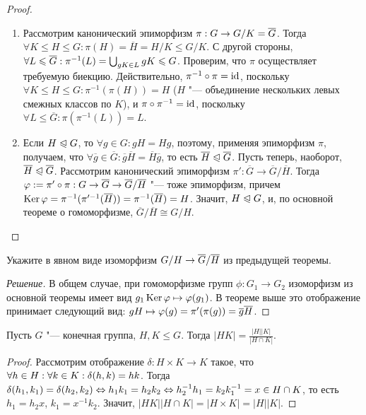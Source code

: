 \begin{proof}~
	\begin{enumerate}
		\item Рассмотрим канонический эпиморфизм $\pi: G \hm\to G / K = \overline{G}$. Тогда $\forall K \le H \le G: \pi(H) =\overline{H} = H / K \le G / K$. С другой стороны, $\forall L \le \overline{G}: \pi^{-1}(L) = \bigcup_{gK \in L}gK \hm\le G$. Проверим, что $\pi$ осуществляет требуемую биекцию. Действительно, $\pi^{-1}\circ\pi \hm= \id$, поскольку $\forall K \le H \le G: \pi^{-1}(\pi(H)) = H$ ($H$ "--- объединение нескольких левых смежных классов по $K$), и $\pi\circ\pi^{-1} = \operatorname{id}$, поскольку $\forall L \le \overline{G}: \pi(\pi^{-1}(L)) = L$.
		
		\item Если $H \trianglelefteqslant G$, то $\forall g \in G: gH = Hg$, поэтому, применяя эпиморфизм $\pi$, получаем, что $\forall \overline{g} \in \overline{G}: \overline{g}\overline{H} = \overline{H}\overline{g}$, то есть $\overline{H} \trianglelefteqslant \overline{G}$. Пусть теперь, наоборот, $\overline{H} \trianglelefteqslant \overline{G}$. Рассмотрим канонический эпиморфизм $\pi': \overline{G} \to \overline{G} / \overline{H}$. Тогда $\phi := \pi'\circ\pi: G \hm\to \overline{G} \hm\to \overline{G} / \overline{H}$ "--- тоже эпиморфизм, причем $\ke\phi = \pi^{-1}(\pi'^{-1}(\overline{H})) \hm= \pi^{-1}(\overline{H}) = H$. Значит, $H \trianglelefteqslant G$, и, по основной теореме о гомоморфизме, $\overline{G} / \overline{H} \cong G / H$.
	\end{enumerate}
\end{proof}

\begin{exercise}
	Укажите в явном виде изоморфизм $G / H \hm\to \overline{G} / \overline{H}$ из предыдущей теоремы.
\end{exercise}

\begin{proof}[Решение]
	В общем случае, при гомоморфизме групп $\phi: G_1 \to G_2$ изоморфизм из основной теоремы имеет вид $g_1\operatorname{Ker}\varphi \mapsto \varphi(g_1)$. В теореме выше это отображение принимает следующий вид: $gH \hm\mapsto \phi(g) = \pi'(\pi(g)) = \overline{g}\overline{H}$.
\end{proof}

\begin{proposition}
	Пусть $G$ "--- конечная группа, $H, K \le G$. Тогда $|HK| = \frac{|H||K|}{|H\cap K|}$.
\end{proposition}

\begin{proof}
	Рассмотрим отображение $\delta: H\times K \to K$ такое, что $\forall h \hm\in H: \forall k \in K: \delta(h, k) = hk$. Тогда $\delta(h_1, k_1) = \delta(h_2, k_2) \hm\Leftrightarrow h_1k_1 = h_2k_2 \hm\Leftrightarrow h_2^{-1}h_1 = k_2k_1^{-1} = x \in H \cap K$, то есть $h_1 = h_2x$, $k_1 = x^{-1}k_2$. Значит, $|HK||H \cap K| = |H \times K| = |H||K|$.
\end{proof}

